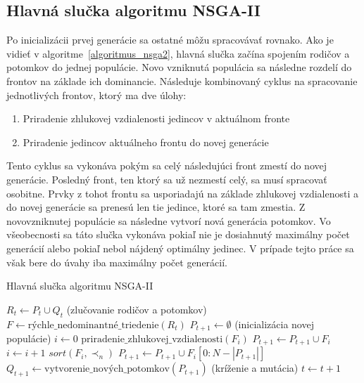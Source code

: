 \subsection*{Hlavná slučka algoritmu NSGA-II}
Po inicializácii prvej generácie sa ostatné môžu spracovávať rovnako.
Ako je vidieť v algoritme~\ref{algoritmus_nsga2}, hlavná slučka začína spojením rodičov a potomkov do jednej populácie.
Novo vzniknutá populácia sa následne rozdelí do frontov na základe ich dominancie.
Následuje kombinovaný cyklus na spracovanie jednotlivých frontov, ktorý ma dve úlohy:
\begin{enumerate}
  \item Priradenie zhlukovej vzdialenosti jedincov v aktuálnom fronte
  \item Priradenie jedincov aktuálneho frontu do novej generácie
\end{enumerate}
Tento cyklus sa vykonáva pokým sa celý následujúci front zmestí do novej generácie.
Posledný front, ten ktorý sa už nezmestí celý, sa musí spracovať osobitne.
Prvky z tohot frontu sa usporiadajú na základe zhlukovej vzdialenosti a do novej generácie sa prenesú len tie jedince, ktoré sa tam zmestia.
Z novovzniknutej populácie sa následne vytvorí nová generácia potomkov.
Vo všeobecnosti sa táto slučka vykonáva pokiaľ nie je dosiahnutý maximálny počet generácií alebo pokiaľ nebol nájdený optimálny jedinec.
V prípade tejto práce sa však bere do úvahy iba maximálny počet generácií.

\vspace*{\dimexpr0.5\baselineskip\relax}
\begin{algorithm}[h]\label{algoritmus_nsga2}
\caption{Hlavná slučka algoritmu NSGA-II}
  $R_t \gets P_t \cup Q_t$ (zlučovanie rodičov a potomkov)\;
  $F \gets \text{rýchle\_nedominantné\_triedenie}(R_t)$\;
  $P_{t+1} \gets \emptyset$ (inicializácia novej populácie)\;
  $i \gets 0$\;
   {
    $\text{priradenie\_zhlukovej\_vzdialenosti}(F_i)$\;
    $P_{t+1} \gets P_{t+1} \cup F_i$\;
    $i \gets i + 1$\;
  }
  $sort(F_i, \prec_n)$\;
  $P_{t+1} \gets P_{t+1} \cup F_i[0:N - |P_{t+1}|]$\;
  $Q_{t+1} \gets \text{vytvorenie\_nových\_potomkov}(P_{t+1})$ (kríženie a mutácia)\;
  $t \gets t + 1$\;
\end{algorithm}

